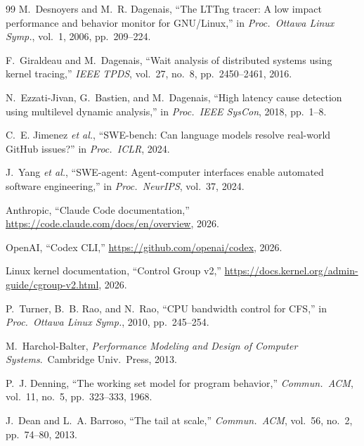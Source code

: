 \documentclass[10pt,conference]{IEEEtran}
\begin{document}
\begin{thebibliography}{99}
M.~Desnoyers and M.~R. Dagenais, ``The LTTng tracer: A low impact
performance and behavior monitor for GNU/Linux,'' in \emph{Proc.\ Ottawa Linux Symp.}, vol.~1, 2006, pp.\ 209--224.

F.~Giraldeau and M.~Dagenais, ``Wait analysis of distributed systems using
kernel tracing,'' \emph{IEEE TPDS}, vol.~27, no.~8, pp.\ 2450--2461, 2016.

N.~Ezzati-Jivan, G.~Bastien, and M.~Dagenais, ``High latency cause
detection using multilevel dynamic analysis,'' in \emph{Proc.\ IEEE SysCon}, 2018, pp.\ 1--8.

C.~E. Jimenez \emph{et al.}, ``SWE-bench: Can language models resolve real-world GitHub
issues?'' in \emph{Proc.\ ICLR}, 2024.

J.~Yang \emph{et al.}, ``SWE-agent: Agent-computer interfaces enable automated software
engineering,'' in \emph{Proc.\ NeurIPS}, vol.~37, 2024.

Anthropic, ``Claude Code documentation,''
\url{https://code.claude.com/docs/en/overview}, 2026.

OpenAI, ``Codex CLI,''
\url{https://github.com/openai/codex}, 2026.

Linux kernel documentation, ``Control Group v2,''
\url{https://docs.kernel.org/admin-guide/cgroup-v2.html}, 2026.

P.~Turner, B.~B. Rao, and N.~Rao, ``CPU bandwidth control for CFS,'' in \emph{Proc.\ Ottawa Linux Symp.}, 2010, pp.\ 245--254.

M.~Harchol-Balter, \emph{Performance Modeling and Design of Computer
Systems}.\ Cambridge Univ.\ Press, 2013.

P.~J. Denning, ``The working set model for program behavior,''
\emph{Commun.\ ACM}, vol.~11, no.~5, pp.\ 323--333, 1968.

J.~Dean and L.~A. Barroso, ``The tail at scale,'' \emph{Commun.\ ACM}, vol.~56, no.~2, pp.\ 74--80, 2013.

\end{thebibliography}
\end{document}
